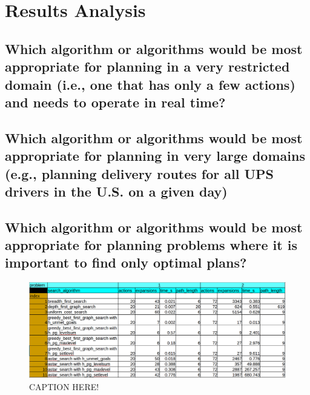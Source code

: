 \documentclass[a4paper,12pt]{article}
\begin{document}
\section{Results Analysis}
\subsection{Which algorithm or algorithms would be most appropriate for planning in a very restricted domain (i.e., one that has only a few actions) and needs to operate in real time?}


\subsection{Which algorithm or algorithms would be most appropriate for planning in very large domains (e.g., planning delivery routes for all UPS drivers in the U.S. on a given day)}


\subsection{Which algorithm or algorithms would be most appropriate for planning problems where it is important to find only optimal plans? }



\begin{figure}[!h]
\centering
\includegraphics[width=5.0in]{results/results12.png}
\caption{CAPTION HERE!}
\label{fig_raw_data}
\end{figure}
\end{document}
